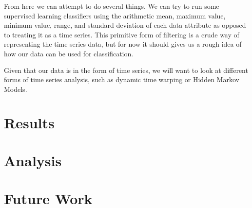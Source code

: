 \documentclass{amsart}
\begin{document}
From here we can attempt to do several things. We can try to run some supervised learning classifiers using the arithmetic mean, maximum value, minimum value, range, and standard deviation of each data attribute as opposed to treating it as a time series. This primitive form of filtering is a crude way of representing the time series data, but for now it should gives us a rough idea of how our data can be used for classification.

Given that our data is in the form of time series, we will want to look at different forms of time series analysis, such as dynamic time warping or Hidden Markov Models. 

\section{Results}

\section{Analysis}

\section{Future Work}

\end{document}
